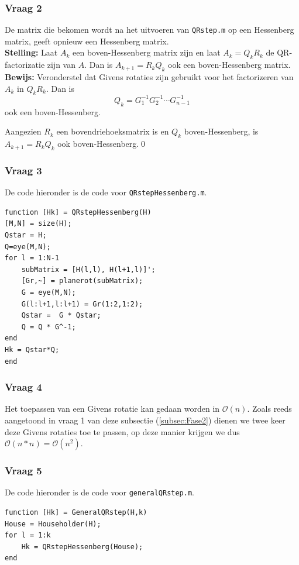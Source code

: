 \documentclass{article}
\begin{document}
\subsubsection*{Vraag 2}
De matrix die bekomen wordt na het uitvoeren van \texttt{QRstep.m} op een Hessenberg matrix, geeft opnieuw een Hessenberg matrix.\\

\noindent\textbf{Stelling:} Laat $A_k$ een boven-Hessenberg matrix zijn en laat $A_k=Q_{k}R_{k}$ de QR-factorizatie zijn van $A$. Dan is $A_{k+1}=R_{k}Q_{k}$ ook een boven-Hessenberg matrix.\\
\noindent\textbf{Bewijs:} Veronderstel dat Givens rotaties zijn gebruikt voor het factorizeren van $A_k$ in $Q_{k}R_{k}$. Dan is
\[Q_k=G_1^{-1}G_2^{-1}\cdots G_{n-1}^{-1}\]
ook een boven-Hessenberg.

Aangezien $R_k$ een bovendriehoeksmatrix is en $Q_k$ boven-Hessenberg, is $A_{k+1}=R_{k}Q_{k}$ ook boven-Hessenberg.\qed
\subsubsection*{Vraag 3}

De code hieronder is de code voor \texttt{QRstepHessenberg.m}.
\vspace{-5mm}
\begin{lstlisting}
function [Hk] = QRstepHessenberg(H)
[M,N] = size(H);
Qstar = H;
Q=eye(M,N);
for l = 1:N-1
    subMatrix = [H(l,l), H(l+1,l)]';
    [Gr,~] = planerot(subMatrix);
    G = eye(M,N);
    G(l:l+1,l:l+1) = Gr(1:2,1:2); 
    Qstar =  G * Qstar;
    Q = Q * G^-1;
end
Hk = Qstar*Q;
end
\end{lstlisting}

\subsubsection*{Vraag 4}
Het toepassen van een Givens rotatie kan gedaan worden in $\mathcal{O}(n)$. Zoals reeds aangetoond in vraag 1 van deze subsectie (\ref{subsec:Fase2})  dienen we twee keer deze Givens rotaties toe te passen, op deze manier krijgen we dus $\mathcal{O}(n*n)=\mathcal{O}(n^2)$.


\subsubsection*{Vraag 5}
De code hieronder is de code voor \texttt{generalQRstep.m}.
\vspace{-5mm}
\begin{lstlisting}
function [Hk] = GeneralQRstep(H,k)
House = Householder(H);
for l = 1:k
    Hk = QRstepHessenberg(House);
end
\end{lstlisting}
\end{document}
